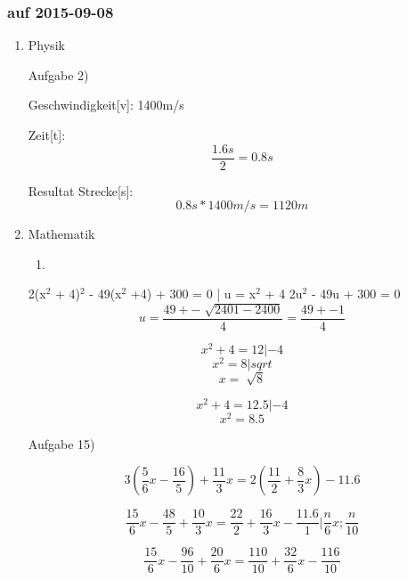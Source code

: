 \documentclass[11pt]{article}
\begin{document}
\subsubsection{auf 2015-09-08}
\label{sec-1-3-1}
\begin{enumerate}
\item Physik
\label{sec-1-3-1-1}

Aufgabe 2)

Geschwindigkeit[v]: 1400m/s

Zeit[t]: \begin{equation} \frac{1.6s}{2} = 0.8s\end{equation}

Resultat Strecke[s]: \begin{equation}0.8s * 1400m/s = 1120m\end{equation}

\item Mathematik
\label{sec-1-3-1-2}

\begin{enumerate}
\item 
\end{enumerate}
2(x$^{\text{2}}$ + 4)$^{\text{2}}$ - 49(x$^{\text{2}}$ +4) + 300 = 0 | u = x$^{\text{2}}$ + 4
2u$^{\text{2}}$ - 49u + 300 = 0
\begin{equation}
u = \frac{49 +- \sqrt[]{2401 - 2400}}{4} = \frac{49 +- 1}{4}
\end{equation}


\begin{equation}
x^2 + 4 = 12 | -4
\end{equation}
\begin{equation}
x^2 = 8 | sqrt
\end{equation}
\begin{equation}
x = \sqrt[]{8}
\end{equation}

\begin{equation}
x^2 + 4 = 12.5 | -4
\end{equation}
\begin{equation}
x^2 = 8.5
\end{equation}

Aufgabe 15)

\begin{equation}
3(\frac{5}{6}x - \frac{16}{5}) + \frac{11}{3}x = 2(\frac{11}{2} + \frac{8}{3}x) - 11.6
\end{equation}

\begin{equation}
\frac{15}{6}x - \frac{48}{5} + \frac{10}{3}x = \frac{22}{2} + \frac{16}{3}x - \frac{11.6}{1} | \frac{n}{6}x; \frac{n}{10}
\end{equation}

\begin{equation}
\frac{15}{6}x - \frac{96}{10} + \frac{20}{6}x = \frac{110}{10} + \frac{32}{6}x - \frac{116}{10}
\end{equation}
\end{enumerate}
\end{document}
